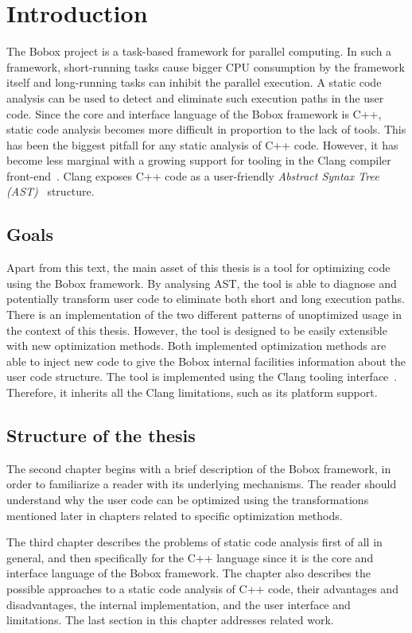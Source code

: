 \chapter{Introduction}
The Bobox project is a task-based framework for parallel computing. In such a framework, short-running tasks cause bigger CPU consumption by the framework itself and long-running tasks can inhibit the parallel execution. A static code analysis can be used to detect and eliminate such execution paths in the user code. Since the core and interface language of the Bobox framework is C++, static code analysis becomes more difficult in proportion to the lack of tools. This has been the biggest pitfall for any static analysis of C++ code. However, it has become less marginal with a growing support for tooling in the Clang compiler front-end~\cite{clang}. Clang exposes C++ code as a user-friendly \emph{Abstract Syntax Tree (AST)}~\cite{ast} structure.

\section{Goals}
Apart from this text, the main asset of this thesis is a tool for optimizing code using the Bobox framework. By analysing AST, the tool is able to diagnose and potentially transform user code to eliminate both short and long execution paths. There is an implementation of the two different patterns of unoptimized usage in the context of this thesis. However, the tool is designed to be easily extensible with new optimization methods. Both implemented optimization methods are able to inject new code to give the Bobox internal facilities information about the user code structure. The tool is implemented using the Clang tooling interface~\cite{clang-documentation}. Therefore, it inherits all the Clang limitations, such as its platform support.

\section{Structure of the thesis}
The second chapter begins with a brief description of the Bobox framework, in order to familiarize a reader with its underlying mechanisms. The reader should understand why the user code can be optimized using the transformations mentioned later in chapters related to specific optimization methods.

The third chapter describes the problems of static code analysis first of all in general, and then specifically for the C++ language since it is the core and interface language of the Bobox framework. The chapter also describes the possible approaches to a static code analysis of C++ code, their advantages and disadvantages, the internal implementation, and the user interface and limitations. The last section in this chapter addresses related work.


